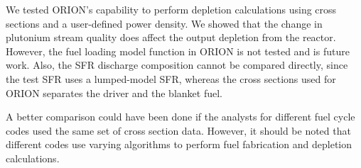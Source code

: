 \documentclass{article}
\begin{document}
We tested ORION's capability to perform depletion calculations
using cross sections and a user-defined power density. We showed that
the change in plutonium stream quality does affect the output depletion
from the reactor. However, the fuel loading model function in ORION is not tested
and is future work. Also, the \gls{SFR} discharge composition cannot be
compared directly, since the test \gls{SFR} uses a lumped-model \gls{SFR},
whereas the cross sections used for ORION separates the driver and the blanket fuel.

A better comparison could have been done if the analysts for different fuel cycle
codes used the same set of cross section data. However, it should be noted that
different codes use varying algorithms to perform fuel fabrication and depletion
calculations.




\end{document}
